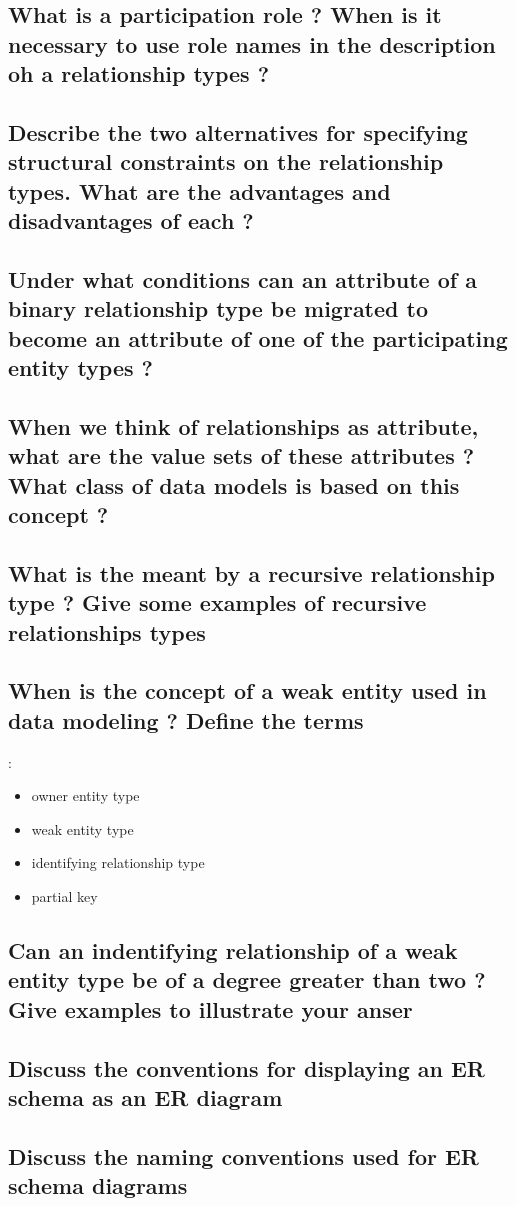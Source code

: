 \subsection{What is a participation role ? When is it necessary to use role names in the description oh a relationship types ?}

\subsection{Describe the two alternatives for specifying structural constraints on the relationship types. What are the advantages and disadvantages of each ?}

\subsection{Under what conditions can an attribute of a binary relationship type be migrated to become an attribute of one of the participating entity types ?}

\subsection{When we think of relationships as attribute, what are the value sets of these attributes ? What class of data models is based on this concept ?}

\subsection{What is the meant by a recursive relationship type ? Give some examples of recursive relationships types}

\subsection{When is the concept of a weak entity used in data modeling ? Define the terms} :
\begin{itemize}
	\item owner entity type
	\item weak entity type
	\item identifying relationship type
	\item partial key
\end{itemize}

\subsection{Can an indentifying relationship of a weak entity type be of a degree greater than two ? Give examples to illustrate your anser}

\subsection{Discuss the conventions for displaying an ER schema as an ER diagram}

\subsection{Discuss the naming conventions used for ER schema diagrams}